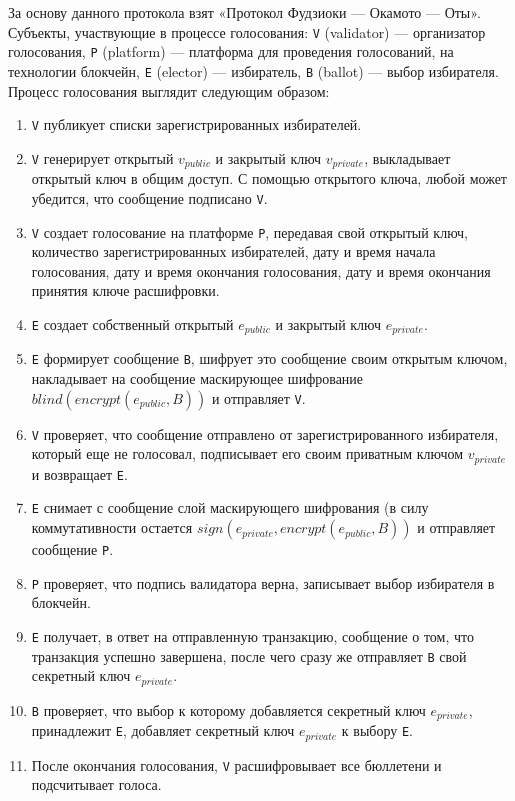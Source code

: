 За основу данного протокола взят «Протокол Фудзиоки — Окамото — Оты». Субъекты, участвующие в процессе голосования: \verb|V| (validator) — организатор голосования, \verb|P| (platform) — платформа для проведения голосований, на технологии блокчейн, \verb|E| (elector) — избиратель, \verb|B| (ballot) — выбор избирателя. Процесс голосования выглядит следующим образом:

\begin{enumerate} 
  \item \verb|V| публикует списки зарегистрированных избирателей.
  
  \item \verb|V| генерирует открытый \(v_{public}\) и закрытый ключ \(v_{private}\), выкладывает открытый ключ в общим доступ. С помощью открытого ключа, любой может убедится, что сообщение подписано \verb|V|.
  
  \item \verb|V| создает голосование на платформе \verb|P|, передавая свой открытый ключ, количество зарегистрированных избирателей, дату и время начала голосования, дату и время окончания голосования, дату и время окончания принятия ключе расшифровки.
  
  \item \verb|E| создает собственный открытый \(e_{public}\) и закрытый ключ \(e_{private}\).
  
   \item \verb|E| формирует сообщение \verb|B|, шифрует это сообщение своим открытым ключом, накладывает на сообщение маскирующее шифрование \(blind(encrypt(e_{public}, B))\) и отправляет \verb|V|.
  
  \item \verb|V| проверяет, что сообщение отправлено от зарегистрированного избирателя, который еще не голосовал, подписывает его своим приватным ключом \(v_{private}\) и возвращает \verb|E|.
  
  \item \verb|E| снимает с сообщение слой маскирующего шифрования (в силу коммутативности остается \(sign(e_{private}, encrypt(e_{public}, B))\) и отправляет сообщение \verb|P|.
  
  \item \verb|P| проверяет, что подпись валидатора верна, записывает выбор избирателя в блокчейн.
  
   \item \verb|E| получает, в ответ на отправленную транзакцию, сообщение о том, что транзакция успешно завершена, после чего сразу же отправляет \verb|B| свой секретный ключ \(e_{private}\).
   
   \item \verb|B| проверяет, что выбор к которому добавляется секретный ключ \(e_{private}\), принадлежит \verb|E|, добавляет секретный ключ \(e_{private}\) к выбору \verb|E|.
   
   \item После окончания голосования, \verb|V| расшифровывает все бюллетени и подсчитывает голоса.
\end{enumerate}

